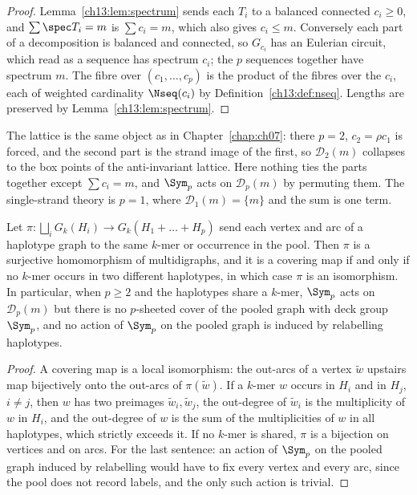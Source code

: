 \begin{proof}
Lemma~\ref{ch13:lem:spectrum} sends each $T_i$ to a balanced connected $c_i\ge0$, and
$\sum\spec T_i=m$ is $\sum c_i=m$, which also gives $c_i\le m$. Conversely each part of a
decomposition is balanced and connected, so $G_{c_i}$ has an Eulerian circuit, which read as
a sequence has spectrum $c_i$; the $p$ sequences together have spectrum $m$. The fibre over
$(c_1,\dots,c_p)$ is the product of the fibres over the $c_i$, each of weighted cardinality
$\Nseq(c_i)$ by Definition~\ref{ch13:def:nseq}. Lengths are preserved by Lemma~\ref{ch13:lem:spectrum}.
\end{proof}

\begin{remark}
The lattice is the same object as in Chapter~\ref{chap:ch07}: there $p=2$, $c_2=\rho c_1$ is forced, and
the second part is the strand image of the first, so $\mathcal D_2(m)$ collapses to the box
points of the anti-invariant lattice. Here nothing ties the parts together except $\sum c_i=m$,
and $\Sym_p$ acts on $\mathcal D_p(m)$ by permuting them. The single-strand theory is
$p=1$, where $\mathcal D_1(m)=\{m\}$ and the sum is one term.
\end{remark}

\begin{proposition}[No covering]\label{ch13:prop:cover}
Let $\pi\colon\bigsqcup_i G_k(H_i)\to G_k(H_1{+}\dots{+}H_p)$ send each vertex and arc of a
haplotype graph to the same $k$-mer or occurrence in the pool. Then $\pi$ is a surjective
homomorphism of multidigraphs, and it is a covering map if and only if no $k$-mer occurs in
two different haplotypes, in which case $\pi$ is an isomorphism. In particular, when
$p\ge2$ and the haplotypes share a $k$-mer, $\Sym_p$ acts on $\mathcal D_p(m)$ but there is no
$p$-sheeted cover of the pooled graph with deck group $\Sym_p$, and no action of $\Sym_p$ on
the pooled graph is induced by relabelling haplotypes.
\end{proposition}

\begin{proof}
A covering map is a local isomorphism: the out-arcs of a vertex $\tilde w$ upstairs map
bijectively onto the out-arcs of $\pi(\tilde w)$. If a $k$-mer $w$ occurs in $H_i$ and in
$H_j$, $i\ne j$, then $w$ has two preimages $\tilde w_i,\tilde w_j$, the out-degree of
$\tilde w_i$ is the multiplicity of $w$ in $H_i$, and the out-degree of $w$ is the sum of the
multiplicities of $w$ in all haplotypes, which strictly exceeds it. If no $k$-mer is shared,
$\pi$ is a bijection on vertices and on arcs. For the last sentence: an action of $\Sym_p$ on
the pooled graph induced by relabelling would have to fix every vertex and every arc, since
the pool does not record labels, and the only such action is trivial.
\end{proof}


